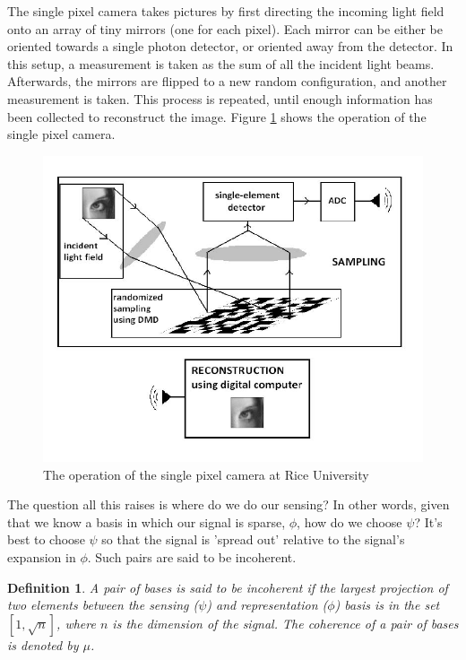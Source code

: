 \documentclass[conference]{IEEEtran}
\newtheorem{defn}{Definition}
\begin{document}
The single pixel camera takes pictures by first directing the incoming light field onto an array of tiny mirrors (one for each pixel). Each mirror can be either be oriented towards a single photon detector, or oriented away from the detector. In this setup, a measurement is taken as the sum of all the incident light beams. Afterwards, the mirrors are flipped to a new random configuration, and another measurement is taken. This process is repeated, until enough information has been collected to reconstruct the image. Figure \ref{singlepixelcamera} shows the operation of the single pixel camera.

\begin{figure}[h]
\centering
\includegraphics[height = 7 cm]{singlepixel.png}
\caption{The operation of the single pixel camera at Rice University \cite{singlepixelimaging}}
\label{singlepixelcamera}
\end{figure}



The question all this raises is where do we do our sensing? In other words, given that we know a basis in which our signal is sparse, \(\phi\), how do we choose \(\psi\)? It's best to choose \(\psi\) so that the signal is 'spread out' relative to the signal's expansion in \(\phi\). Such pairs are said to be incoherent. 

\begin{defn}
A pair of bases is said to be incoherent if the largest projection of two elements between the sensing (\(\psi\)) and representation (\(\phi\)) basis  is in the set \( [1 , \sqrt{n}] \), where \( n \) is the dimension of the signal. The coherence of a pair of bases is denoted by \(\mu\).
\end{defn}
\end{document}

